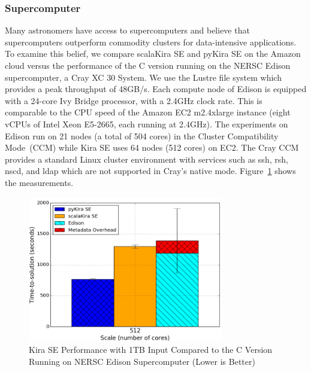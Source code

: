 \documentclass[10pt,journal,compsoc]{IEEEtran}
\begin{document}
\subsubsection{Supercomputer}

Many astronomers have access to supercomputers and believe that
supercomputers outperform commodity clusters for data-intensive applications.
To examine this belief, we compare scalaKira SE and pyKira SE on the Amazon cloud versus the performance of
the C version running on the NERSC Edison supercomputer, a Cray XC 30 System. We use
the Lustre file system which provides a peak throughput of 48GB/s. Each compute
node of Edison is equipped with a 24-core Ivy Bridge processor, with a 2.4GHz clock rate.
This is comparable to the CPU speed of the Amazon EC2 m2.4xlarge instance (eight vCPUs of
Intel Xeon E5-2665, each running at 2.4GHz). The experiments on Edison run on 21
nodes (a total of 504 cores) in the Cluster Compatibility Mode~(CCM)
while Kira SE uses 64 nodes (512 cores) on EC2. The Cray CCM provides a 
standard Linux cluster environment with services such as ssh, rsh, nscd, and ldap which 
are not supported in Cray's native mode.
Figure~\ref{fig:1tb-edison} shows the measurements.

\begin{figure}[h]
	\begin{center}
		\includegraphics[width=85mm]{pictures/1TB-edison}
		\caption{Kira SE Performance with 1TB Input Compared to the C Version Running on NERSC Edison Supercomputer (Lower is Better)
		\label{fig:1tb-edison}}
  	\end{center}
\end{figure}
\end{document}
